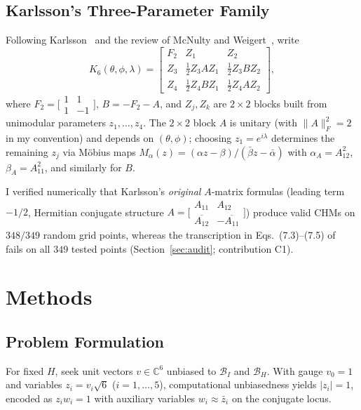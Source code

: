 \documentclass[onecolumn]{IEEEtran}
\begin{document}
\subsection{Karlsson's Three-Parameter Family}
Following Karlsson~\cite{Karlsson2011} and the review of McNulty and Weigert~\cite{McNulty2024}, write
\begin{equation}
    K_6(\theta,\phi,\lambda)=
    \begin{bmatrix}
        F_2 & Z_1 & Z_2 \\
        Z_3 & \tfrac{1}{2}Z_3 A Z_1 & \tfrac{1}{2}Z_3 B Z_2 \\
        Z_4 & \tfrac{1}{2}Z_4 B Z_1 & \tfrac{1}{2}Z_4 A Z_2
    \end{bmatrix},
\end{equation}
where $F_2=\bigl[\begin{smallmatrix}1&1\\1&-1\end{smallmatrix}\bigr]$, $B=-F_2-A$, and $Z_j,Z_k$ are $2\times2$ blocks built from unimodular parameters $z_1,\ldots,z_4$.
The $2\times2$ block $A$ is unitary (with $\|A\|_F^2=2$ in my convention) and depends on $(\theta,\phi)$; choosing $z_1=e^{i\lambda}$ determines the remaining $z_j$ via M\"obius maps $M_\alpha(z)=(\alpha z-\beta)/(\bar\beta z-\bar\alpha)$ with $\alpha_A=A_{12}^2$, $\beta_A=A_{11}^2$, and similarly for $B$.

I verified numerically that Karlsson's \emph{original} $A$-matrix formulas (leading term $-1/2$, Hermitian conjugate structure $A=\bigl[\begin{smallmatrix}A_{11}&A_{12}\\ \overline{A_{12}}&-\overline{A_{11}}\end{smallmatrix}\bigr]$) produce valid CHMs on $348/349$ random grid points, whereas the transcription in Eqs.~(7.3)--(7.5) of~\cite{McNulty2024} fails on all $349$ tested points (Section~\ref{sec:audit}; contribution C1).

\section{Methods}
\label{sec:methods}

\subsection{Problem Formulation}
For fixed $H$, seek unit vectors $v\in\mathbb{C}^6$ unbiased to $\mathcal{B}_I$ and $\mathcal{B}_H$.
With gauge $v_0=1$ and variables $z_i=v_i\sqrt{6}$ ($i=1,\ldots,5$), computational unbiasedness yields $|z_i|=1$, encoded as $z_i w_i=1$ with auxiliary variables $w_i\approx\bar z_i$ on the conjugate locus.
\end{document}
